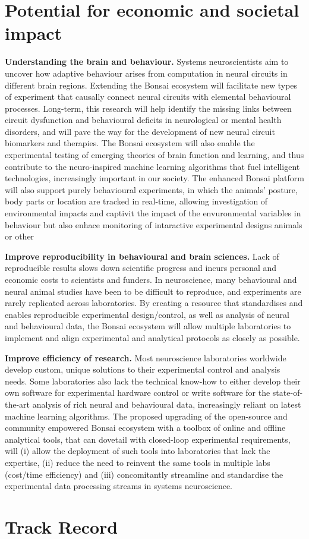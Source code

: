 \documentclass[a4paper,11pt]{article}
\begin{document}
\section{Potential for economic and societal impact}
\textbf{Understanding the brain and behaviour.} Systems neuroscientists aim to uncover how adaptive behaviour arises
from computation in neural circuits in different brain regions. Extending the Bonsai ecosystem will facilitate new types of experiment that causally connect neural circuits with elemental behavioural processes. Long-term, this research will help identify the missing links between circuit dysfunction and behavioural deficits in neurological or mental health disorders, and will pave the way for the development of new neural circuit biomarkers and therapies. The Bonsai ecosystem will also enable the experimental testing of emerging theories of brain function and learning, and thus contribute to the neuro-inspired machine learning algorithms that fuel intelligent technologies, increasingly important in our society.
The enhanced Bonsai platform will also support purely behavioural experiments, in which the animals' posture, body parts or location are tracked in real-time, allowing investigation of environmental impacts and captivit the impact of the envuronmental variables in behaviour but also enhace monitoring of intaractive experimental designs animals or other  

\textbf{Improve reproducibility in behavioural and brain sciences.} Lack of reproducible results slows down scientific progress and incurs personal and economic costs to scientists and funders.  In neuroscience,  many behavioural and neural animal studies have been to be difficult to reproduce, and experiments are rarely replicated across laboratories. By creating a resource that standardises and enables reproducible experimental design/control, as well as analysis of neural and behavioural data, the Bonsai ecosystem will allow multiple laboratories to implement and align experimental and analytical protocols as closely as possible.

\textbf{Improve efficiency of research.} Most neuroscience laboratories worldwide develop custom, unique solutions to their experimental control and analysis needs. Some laboratories also lack the technical know-how to either develop their own software for experimental hardware control or write software for the state-of-the-art analysis of rich neural and behavioural data, increasingly reliant on latest machine learning algorithms. The proposed upgrading of the open-source and community empowered Bonsai ecosystem with a toolbox of online and offline analytical tools, that can dovetail with closed-loop experimental requirements, will (i) allow the deployment of such tools into laboratories that lack the expertise, (ii) reduce the need to reinvent the same tools in multiple labs (cost/time efficiency) and (iii) concomitantly streamline and standardise the experimental data processing streams in systems neuroscience.



\section{Track Record}





\end{document}
